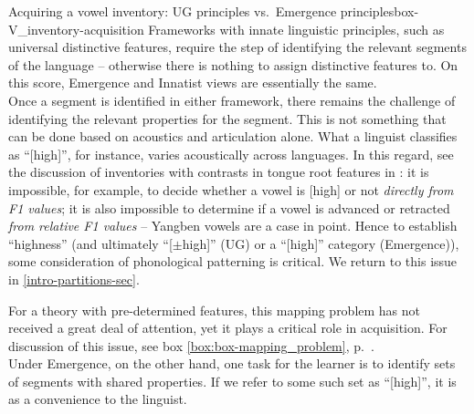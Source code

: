 \begin{dadpbox}{Acquiring a vowel inventory: UG principles vs.\ Emergence principles}{box-V_inventory-acquisition}
Frameworks with innate linguistic principles, such as universal distinctive features, require the step of identifying the relevant segments of the language -- otherwise there is nothing to assign distinctive features to. On this score, Emergence and Innatist views are essentially the same. \\ 

Once a segment is identified in either framework, there remains the challenge of identifying the relevant properties for the segment. This is not something that can be done based on acoustics and articulation alone. What a linguist classifies as ``[high]'', for instance, varies acoustically across languages. In this regard, see the discussion of inventories with contrasts in tongue root features in \citet{Ladefoged+:1996}: it is impossible, for example, to decide  whether a vowel is [high] or not {\it directly from F1 values}; it is also impossible  to determine if a vowel is advanced or retracted {\it from relative F1 values} -- Yangben  vowels are a case in point. {Hence to establish ``highness'' (and ultimately ``[$\pm$high]'' (UG) or a ``[high]'' category (Emergence)), some 
consideration of phonological patterning is critical.} We return to this issue in \textsection\ref{intro-partitions-sec}.\\

For a theory with pre-determined features, this mapping problem has not received a great deal of attention, yet it plays a critical role in acquisition. For discussion of this issue, see box \ref{box:box-mapping_problem}, p.~\pageref{box:box-mapping_problem}. \\

Under Emergence, on the other hand, one task for the learner is to identify sets of segments with shared properties. If we refer to some such set as ``[high]'', it is as a convenience to the linguist.
\end{dadpbox}

